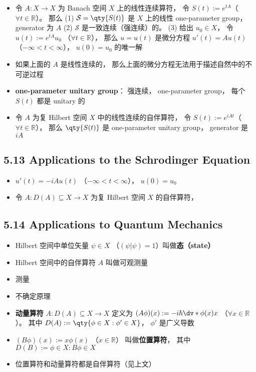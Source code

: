 \begin{itemize}
\item 令 $A:X\to X$ 为 Banach 空间 $X$ 上的线性连续算符， 令 $S(t) := e^{tA}$（$\forall t\in\mathbb R$）。 那么 (1) $\mathcal S = \qty{S(t)}$ 是 $X$ 上的线性 one-parameter group， generator 为 $A$ (2) $\mathcal S$ 是一致连续（强连续）的。 (3) 给出 $u_0 \in X$， 令 $u(t) := e^{tA} u_0$ （$\forall t\in\mathbb R$）， 那么 $u = u(t)$ 是微分方程 $u'(t) = Au(t)$ （$-\infty<t<\infty$）， $u(0) = u_0$ 的唯一解

\item 如果上面的 $A$ 是线性连续的， 那么上面的微分方程无法用于描述自然中的不可逆过程

\item \textbf{one-parameter unitary group}： 强连续， one-parameter group， 每个 $S(t)$ 都是 unitary 的

\item 令 $A$ 为复 Hilbert 空间 $X$ 中的线性连续的自伴算符， 令 $S(t) := e^{iAt}$（$\forall t\in\mathbb R$）， 那么 $\qty{S(t)}$ 是 one-parameter unitary group， generator 是 $iA$
\end{itemize}

\subsection{5.13 Applications to the Schrodinger Equation}
\begin{itemize}
\item $u'(t) = -iAu(t)$ （$-\infty<t<\infty$）， $u(0) = u_0$

\item 令 $A:D(A) \subseteq X\to X$ 为复 Hilbert 空间 $X$ 的自伴算符， 
\end{itemize}


\subsection{5.14 Applications to Quantum Mechanics}
\begin{itemize}
\item Hilbert 空间中单位矢量 $\psi\in X$ （$(\psi|\psi)=1$）叫做\textbf{态（state）}

\item Hilbert 空间中的自伴算符 $A$ 叫做可观测量

\item 测量

\item 不确定原理

\item \textbf{动量算符} $A:D(A)\subseteq X\to X$ 定义为 $(A\phi)(x) := -i\hbar \dv*{\phi(x)}{x}$ （$\forall x\in\mathbb R$）。 其中 $D(A) := \qty{\phi\in X: \phi'\in X}$， $\phi'$ 是广义导数

\item $(B\phi)(x) := x\phi(x)$ （$x\in\mathbb R$） 叫做\textbf{位置算符}， 其中 $D(B) := {\phi\in X: B\phi\in X}$

\item 位置算符和动量算符都是自伴算符（见上文）
\end{itemize}

